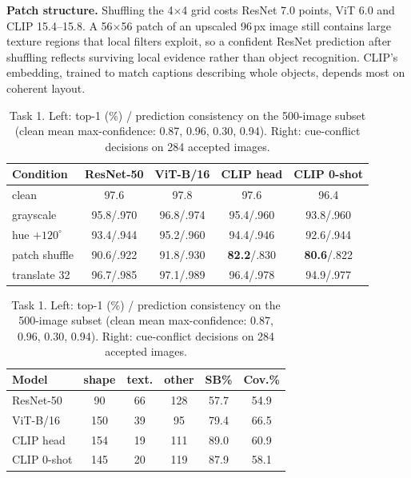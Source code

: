 \documentclass{article}
\begin{document}
\textbf{Patch structure.} Shuffling the 4$\times$4 grid costs ResNet 7.0 points, ViT 6.0 and CLIP 15.4--15.8. A
56$\times$56 patch of an upscaled 96\,px image still contains large texture regions that local filters exploit, so a confident ResNet prediction after shuffling reflects surviving local evidence rather than object recognition. CLIP's embedding, trained to match captions describing whole objects, depends most on coherent layout.



\begin{table}[t]
\centering\small
\caption{Task 1. Left: top-1 (\%) / prediction consistency on the 500-image subset (clean mean max-confidence: 0.87,
0.96, 0.30, 0.94). Right: cue-conflict decisions on 284 accepted images.}
\label{tab:t1}
\setlength{\tabcolsep}{3.5pt}
\begin{tabular}{@{}lcccc@{}}
\toprule
Condition & ResNet-50 & ViT-B/16 & CLIP head & CLIP 0-shot \\
\midrule
clean & 97.6 & 97.8 & 97.6 & 96.4 \\
grayscale & 95.8/.970 & 96.8/.974 & 95.4/.960 & 93.8/.960 \\
hue $+120^\circ$ & 93.4/.944 & 95.2/.960 & 94.4/.946 & 92.6/.944 \\
patch shuffle & 90.6/.922 & 91.8/.930 & \textbf{82.2}/.830 & \textbf{80.6}/.822 \\
translate 32 & 96.7/.985 & 97.1/.989 & 96.4/.978 & 94.9/.977 \\
\bottomrule
\end{tabular}\hfill
\begin{tabular}{@{}lccccc@{}}
\toprule
Model & shape & text. & other & SB\% & Cov.\% \\
\midrule
ResNet-50 & 90 & 66 & 128 & 57.7 & 54.9 \\
ViT-B/16 & 150 & 39 & 95 & 79.4 & 66.5 \\
CLIP head & 154 & 19 & 111 & 89.0 & 60.9 \\
CLIP 0-shot & 145 & 20 & 119 & 87.9 & 58.1 \\
\bottomrule
\end{tabular}
\end{table}
\end{document}
